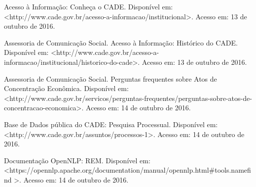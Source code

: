 \documentclass[11pt]{report}
\begin{document}
\begin{enumerate}[label={[\arabic*]}]
\item Acesso à Informação: Conheça o CADE. Disponível em: \textless\enspace http://www.cade.gov.br/acesso-a-informacao/institucional\enspace\textgreater. Acesso em: 13 de outubro de 2016.
\item Assessoria de Comunicação Social. Acesso à Informação: Histórico do CADE. Disponível em: \textless\enspace http://www.cade.gov.br/acesso-a-informacao/institucional/historico-do-cade\enspace\textgreater. Acesso em: 13 de outubro de 2016.
\item Assessoria de Comunicação Social. Perguntas frequentes sobre Atos de Concentração Econômica. Disponível em: \textless\enspace http://www.cade.gov.br/servicos/perguntas-frequentes/perguntas-sobre-atos-de-concentracao-economica\enspace\textgreater. Acesso em: 14 de outubro de 2016.
\item Base de Dados pública do CADE: Pesquisa Processual. Disponível em: \newline\textless\enspace http://www.cade.gov.br/assuntos/processos-1\enspace\textgreater. Acesso em: 14 de outubro de 2016.
\item Documentação OpenNLP: REM. Disponível em: \newline\textless\enspace https://opennlp.apache.org/documentation/manual/opennlp.html\#tools.namefind \enspace\textgreater. Acesso em: 14 de outubro de 2016.
\end{enumerate}
\end{document}
